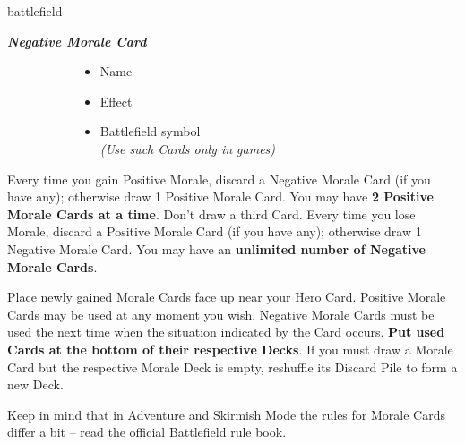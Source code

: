 \begin{multicols*}{2}
\begin{expansion}[before=\vspace*{-11mm}]{battlefield}
\begin{multicols*}{2}
  \textbf{\textit{\textcolor{darkcandyapplered}{Negative Morale Card}}}
\end{multicols*}
\begin{figure}[H]
  \centering
  \footnotesize
  \begin{subfigure}[t]{0.27\linewidth}
    \begin{itemize}
      \item[\textbf{1.}] Name
      \item[\textbf{2.}] Effect
    \end{itemize}
  \end{subfigure}
  \begin{subfigure}[t]{0.7\linewidth}
    \begin{itemize}
      \item[\textbf{3.}] Battlefield symbol\\{\scriptsize\textit{(Use such Cards only in  games)}}
    \end{itemize}
  \end{subfigure}
\end{figure}

Every time you gain Positive Morale, discard a Negative Morale Card (if you have any); otherwise draw 1 Positive Morale Card.
You may have \textbf{2 Positive Morale Cards at a time}.
Don't draw a third Card.
Every time you lose Morale, discard a Positive Morale Card (if you have any); otherwise draw 1 Negative Morale Card.
You may have an \textbf{unlimited number of Negative Morale Cards}.\par
Place newly gained Morale Cards face up near your Hero Card.
Positive Morale Cards may be used at any moment you wish.
Negative Morale Cards must be used the next time when the situation indicated by the Card occurs.
\textbf{Put used Cards at the bottom of their respective Decks}.
If you must draw a Morale Card but the respective Morale Deck is empty, reshuffle its Discard Pile to form a new Deck.

Keep in mind that in Adventure and Skirmish Mode the rules for Morale Cards differ a bit -- read the official Battlefield rule book.
\end{expansion}
\end{multicols*}
